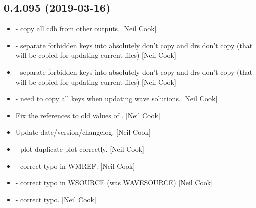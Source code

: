 \documentclass[a4paper,10pt,english]{report}
\begin{document}
\subsection{0.4.095 (2019-03-16)}
\label{\detokenize{misc/changelog:id164}}\begin{itemize}
\item {} 
 - copy all cdb from other outputs. {[}Neil Cook{]}

\item {} 
 - separate forbidden keys into absolutely don’t copy and
drs don’t copy (that will be copied for updating current files) {[}Neil
Cook{]}

\item {} 
 - separate forbidden keys into absolutely don’t copy and
drs don’t copy (that will be copied for updating current files) {[}Neil
Cook{]}

\item {} 
 - need to copy all keys when updating wave solutions.
{[}Neil Cook{]}

\item {} 
Fix the references to old values of . {[}Neil Cook{]}

\item {} 
Update date/version/changelog. {[}Neil Cook{]}

\item {} 
 - plot duplicate plot correctly. {[}Neil Cook{]}

\item {} 
 - correct typo in WMREF. {[}Neil Cook{]}

\item {} 
 - correct typo in WSOURCE (was WAVESOURCE)
{[}Neil Cook{]}

\item {} 
 - correct typo. {[}Neil Cook{]}

\end{itemize}
\end{document}
